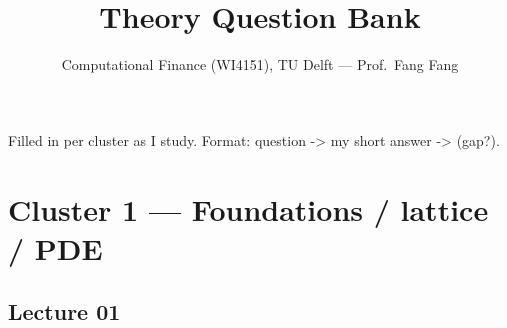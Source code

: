 \documentclass[
  11pt,
]{article}
\title{Theory Question Bank}
\author{Computational Finance (WI4151), TU Delft --- Prof.~Fang Fang}
\date{}
\begin{document}
\maketitle

{
\hypersetup{linkcolor=blue}
\setcounter{tocdepth}{3}
\tableofcontents
}
Filled in per cluster as I study. Format: question -\textgreater{} my
short answer -\textgreater{} (gap?).

\hypertarget{cluster-1-foundations-lattice-pde}{%
\section{Cluster 1 --- Foundations / lattice /
PDE}\label{cluster-1-foundations-lattice-pde}}

\hypertarget{lecture-01}{%
\subsection{Lecture 01}\label{lecture-01}}
\end{document}

